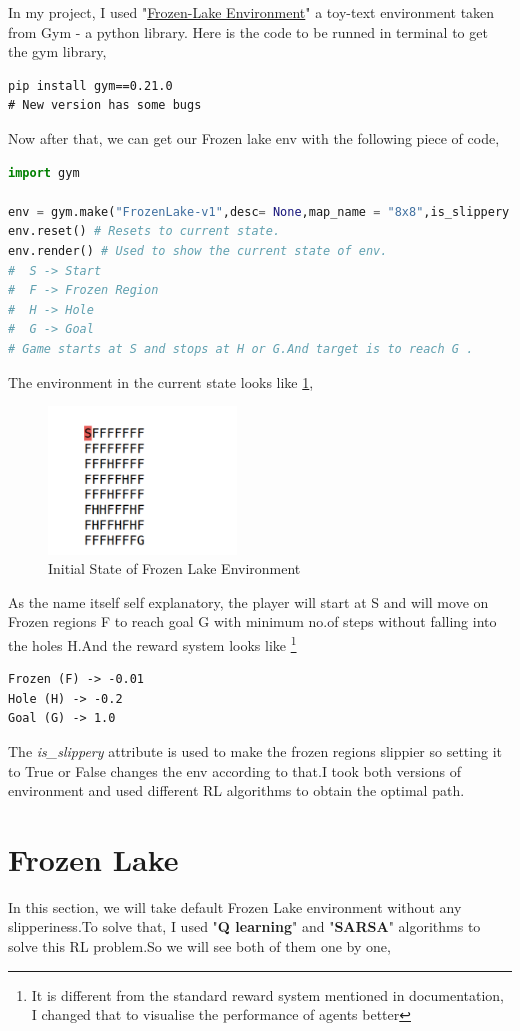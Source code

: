 \documentclass[journal,12pt,onecolumn]{IEEEtran}
\theoremstyle{remark}
\numberwithin{equation}{section}
\begin{document}
In my project, I used "\href{https://www.gymlibrary.dev/environments/toy_text/frozen_lake/}{Frozen-Lake Environment}" a toy-text environment taken from Gym - a python library. Here is the code to be runned in terminal to get the gym library,
        \begin{lstlisting}
pip install gym==0.21.0
# New version has some bugs
	\end{lstlisting}
   Now after that, we can get our Frozen lake env with the following piece of code,
	\begin{lstlisting}[language = Python]
import gym

env = gym.make("FrozenLake-v1",desc= None,map_name = "8x8",is_slippery = False) 
env.reset() # Resets to current state.
env.render() # Used to show the current state of env.
#  S -> Start 
#  F -> Frozen Region
#  H -> Hole
#  G -> Goal
# Game starts at S and stops at H or G.And target is to reach G . 
       \end{lstlisting}
       The environment in the current state looks like \ref{ini_state1},
	      \begin{figure}
		      \centering
		      \includegraphics[width = 5cm]{Figs/cur_state1.png}
                      \caption{Initial State of Frozen Lake Environment}
		      \label{ini_state1}
	      \end{figure}
	      As the name itself self explanatory, the player will start at S and will move on Frozen regions F to reach goal G with minimum no.of steps without falling into the holes H.And the reward system looks like \footnote{It is different from the standard reward system mentioned in documentation, I changed that to visualise the performance of agents better}
        \begin{lstlisting}
Frozen (F) -> -0.01
Hole (H) -> -0.2
Goal (G) -> 1.0
       \end{lstlisting}
       The \textit{is\_slippery} attribute is used to make the frozen regions slippier so setting it to True or False changes the env according to that.I took both versions of environment and used different RL algorithms to obtain the optimal path.
        \section{Frozen Lake} 
	In this section, we will take default Frozen Lake environment without any slipperiness.To solve that, I used "\textbf{Q learning}" and "\textbf{SARSA}" algorithms to solve this RL problem.So we will see both of them one by one,
\end{document}
